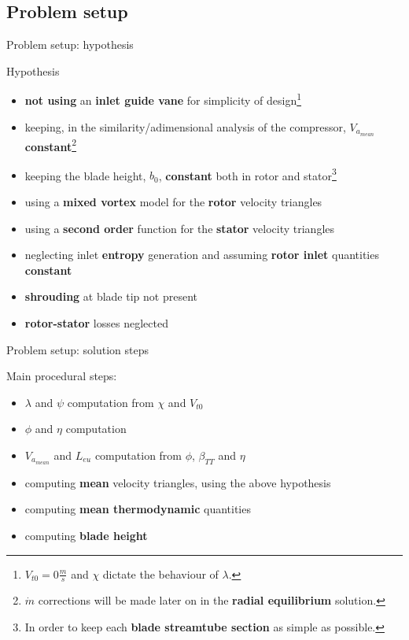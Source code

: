 \subsection{Problem setup}
	{\nologo
	\begin{frame}{Problem setup: hypothesis}
	\begin{alertblock}{Hypothesis}
		\begin{itemize}
			\item \textbf{not using} an \textbf{inlet guide vane} for simplicity of design\footnote{$V_{t0} = 0 \frac{m}{s}$ and $\chi$ dictate the behaviour of $\lambda$.}
			\item keeping, in the similarity/adimensional analysis of the compressor, $V_{a_{mean}}$ \textbf{constant}\footnote{$\dot{m}$ corrections will be made later on in the \textbf{radial equilibrium} solution.}  
			\item keeping the blade height, $b_0$, \textbf{constant} both in rotor and stator\footnote{In order to keep each \textbf{blade streamtube section} as simple as possible.}
			\item using a \textbf{mixed vortex} model for the \textbf{rotor} velocity triangles
			\item using a \textbf{second order} function for the \textbf{stator} velocity triangles 
			\item neglecting inlet \textbf{entropy} generation and assuming \textbf{rotor inlet} quantities \textbf{constant}
			\item \textbf{shrouding} at blade tip not present
			\item \textbf{rotor-stator} losses neglected
		\end{itemize}
	\end{alertblock}
	\end{frame}
	}
		\begin{frame}{Problem setup: solution steps}
		\begin{block}{Main procedural steps:}
			\begin{itemize}
				\item $\lambda$ and $\psi$ computation from $\chi$ and $V_{t0}$
				\item $\phi$ and $\eta$ computation 
				\item $V_{a_{mean}}$ and $L_{eu}$ computation from $\phi$, $\beta_{TT}$ and $\eta$
				\item computing \textbf{mean} velocity triangles, using the above hypothesis
				\item computing \textbf{mean thermodynamic} quantities 
				\item computing \textbf{blade height}
			\end{itemize}
		\end{block}
	\end{frame}
